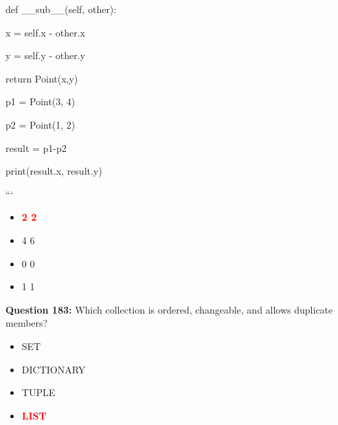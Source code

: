 \documentclass[12pt,a4paper]{article}
\begin{document}
\newline
\newline

\newline
    def __sub__(self, other):\newline

\newline
        x = self.x - other.x\newline

\newline
        y = self.y - other.y\newline

\newline
        return Point(x,y)\newline

\newline
\newline

\newline
p1 = Point(3, 4)\newline

\newline
p2 = Point(1, 2)\newline

\newline
result = p1-p2\newline

\newline
print(result.x, result.y)\newline

\newline
```

\begin{itemize}
    \item[\textbf{A.}] \textcolor{red}{\textbf{2 2}}
    \item[\textbf{B.}] 4 6
    \item[\textbf{C.}] 0 0
    \item[\textbf{D.}] 1 1
\end{itemize}

\vspace{0.5cm}

\textbf{Question 183:} Which collection is ordered, changeable, and allows duplicate members?

\begin{itemize}
    \item[\textbf{A.}] SET
    \item[\textbf{B.}] DICTIONARY
    \item[\textbf{C.}] TUPLE
    \item[\textbf{D.}] \textcolor{red}{\textbf{LIST}}
\end{itemize}
\end{document}
